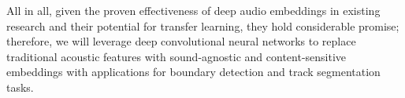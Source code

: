 All in all, given the proven effectiveness of deep audio embeddings in existing research and their potential for transfer learning, they hold considerable promise; therefore, we will leverage deep convolutional neural networks to replace traditional acoustic features with sound-agnostic and content-sensitive embeddings with applications for boundary detection and track segmentation tasks.